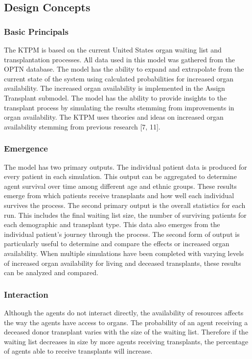 \documentclass[9pt,a4paper,twocolumn]{scrartcl}
\begin{document}
\subsection{Design Concepts}
\subsubsection{Basic Principals}
The KTPM is based on the current United States organ waiting list and transplantation processes.  All data used in this model was gathered from the OPTN database.  The model has the ability to expand and extrapolate from the current state of the system using calculated probabilities for increased organ availability.  The increased organ availability is implemented in the Assign Transplant submodel.  
The model has the ability to provide insights to the transplant process by simulating the results stemming from improvements in organ availability.  The KTPM uses theories and ideas on increased organ availability stemming from previous research [7, 11]. 

\subsubsection{Emergence}
The model has two primary outputs.  The individual patient data is produced for every patient in each simulation.  This output can be aggregated to determine agent survival over time among different age and ethnic groups.  These results emerge from which patients receive transplants and how well each individual survives the process.  The second primary output is the overall statistics for each run.  This includes the final waiting list size, the number of surviving patients for each demographic and transplant type.  This data also emerges from the individual patient’s journey through the process.
The second form of output is particularly useful to determine and compare the effects or increased organ availability.  When multiple simulations have been completed with varying levels of increased organ availability for living and deceased transplants, these results can be analyzed and compared.

\subsubsection{Interaction}
Although the agents do not interact directly, the availability of resources affects the way the agents have access to organs.  The probability of an agent receiving a deceased donor transplant varies with the size of the waiting list.  Therefore if the waiting list decreases in size by more agents receiving transplants, the percentage of agents able to receive transplants will increase.
\end{document}
